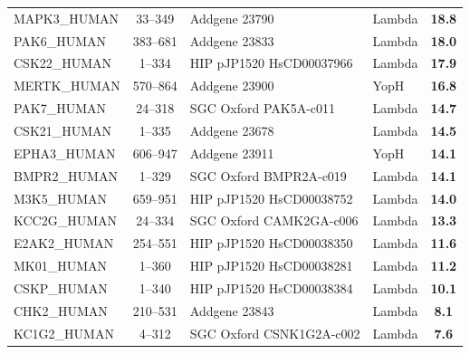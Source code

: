 \documentclass[9pt,lineno]{elife}
\begin{document}
\begin{table}[h!]
\begin{tabular}{p{3cm}cp{3.5cm}p{3cm}c}
MAPK3\_HUMAN & 33--349 & Addgene 23790 & Lambda                    & \cellcolor{forestgreen!55}\bf{18.8}                            \\
PAK6\_HUMAN  & 383--681 & Addgene 23833 & Lambda                    & \cellcolor{forestgreen!55}\bf{18.0}                            \\
CSK22\_HUMAN & 1--334 & HIP pJP1520 HsCD00037966 & Lambda                    & \cellcolor{forestgreen!55}\bf{17.9}                            \\
MERTK\_HUMAN & 570--864 & Addgene 23900 & YopH         & \cellcolor{forestgreen!55}\bf{16.8}                            \\
PAK7\_HUMAN  & 24--318 & SGC Oxford PAK5A-c011 & Lambda                    & \cellcolor{forestgreen!55}\bf{14.7}                            \\
CSK21\_HUMAN & 1--335 & Addgene 23678 & Lambda                    & \cellcolor{forestgreen!55}\bf{14.5}                            \\
EPHA3\_HUMAN & 606--947 & Addgene 23911 & YopH         & \cellcolor{forestgreen!55}\bf{14.1}                            \\
BMPR2\_HUMAN & 1--329 & SGC Oxford BMPR2A-c019 & Lambda                    & \cellcolor{forestgreen!55}\bf{14.1}                            \\
M3K5\_HUMAN  & 659--951 & HIP pJP1520 HsCD00038752 & Lambda                    & \cellcolor{forestgreen!55}\bf{14.0}                            \\
KCC2G\_HUMAN & 24--334 & SGC Oxford CAMK2GA-c006 & Lambda                    & \cellcolor{forestgreen!55}\bf{13.3}                            \\
E2AK2\_HUMAN & 254--551 & HIP pJP1520 HsCD00038350 & Lambda                    & \cellcolor{yellow!55}\bf{11.6}                            \\
MK01\_HUMAN  & 1--360 & HIP pJP1520 HsCD00038281 & Lambda                    & \cellcolor{yellow!55}\bf{11.2}                            \\
CSKP\_HUMAN  & 1--340 & HIP pJP1520 HsCD00038384 & Lambda                    & \cellcolor{yellow!55}\bf{10.1}                            \\
CHK2\_HUMAN  & 210--531 & Addgene 23843 & Lambda                    & \cellcolor{yellow!55}\bf{8.1}                             \\
KC1G2\_HUMAN & 4--312 & SGC Oxford CSNK1G2A-c002 & Lambda                    & \cellcolor{yellow!55}\bf{7.6}                             \\

\end{tabular}
\end{table}
\end{document}
